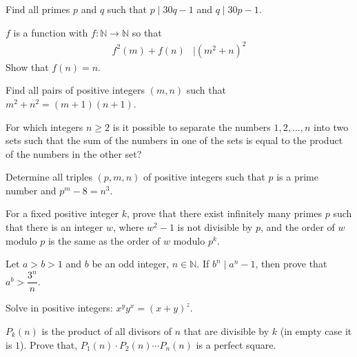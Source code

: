 \documentclass[problems.tex]{subfile}
\begin{document}
	\begin{problem}
		Find all primes $p$ and $q$ such that $p \mid  30q-1$ and $q \mid  30p-1$.
	\end{problem}

	\begin{problem}
		$f$ is a function with $f:\mathbb{N}\to\mathbb{N} $ so that
			\begin{align*}
				f^2(m)+f(n) & \mid  (m^2+n)^2
			\end{align*}
		Show that $f(n)=n$.
	\end{problem}

	\begin{problem}[Columbia $2010$]
		Find all pairs of positive integers $(m,n)$ such that $m^2+n^2=(m+1)(n+1)$.
	\end{problem}

	\begin{problem}
		For which integers $n\geq2$ is it possible to separate the numbers $1, 2,\ldots, n$ into two sets such that the sum of the numbers in one of the sets is equal to the product of the numbers in the other set?
	\end{problem}

	\begin{problem}[Greece]
		Determine all triples $(p, m, n)$ of positive integers such that $p$ is a prime number and $p^m-8=n^3$.
	\end{problem}

	\begin{problem}
		For a fixed positive integer $k$, prove that there exist infinitely many primes $p$ such that there is an integer $w$, where $w^2-1$ is not divisible by $p$, and the order of $w$ modulo $p$ is the same as the order of $w$ modulo $p^k$.
	\end{problem}

	\begin{problem}
		Let $a>b>1$ and $b$ be an odd integer, $n\in\mathbb{N}$. If $b^n\mid a^n-1$, then prove that $a^b>\dfrac{3^n}{n}$.
	\end{problem}

	\begin{problem}[Kazakhstan $2015$]
		Solve in positive integers: $x^yy^x = (x+y)^z$.
	\end{problem}

	\begin{problem}[Kazakhstan $2015$]
		$P_k(n)$ is the product of all divisors of $n$ that are divisible by $k$ (in empty case it is $1$). Prove that, $P_1(n)\cdot P_2(n)\cdots P_n(n)$ is a perfect square.
	\end{problem}
\end{document}

